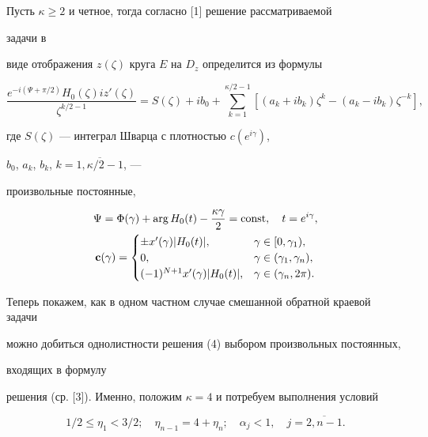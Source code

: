 Пусть $\kappa\ge 2$ и четное, тогда согласно [1] решение рассматриваемой 


задачи в


виде отображения $z(\zeta)$ круга $E$ на $D_z$ определится из формулы


\begin{equation}


\frac{e^{-i(\Psi+\pi/2)}H_0(\zeta)iz'(\zeta)}{\zeta^{k/2-1}}=S(\zeta)+


ib_{0} + \sum_{k=1}^{\kappa/2-1}[(a_k+ib_k)\zeta^k-(a_k-ib_k)\zeta^{-k}],


\end{equation}


где $S(\zeta)$ --- интеграл Шварца с плотностью $c(e^{i\gamma})$,


$b_0$, $a_k$, $b_k$, $k=\overline{1,\kappa/2 -1}$, ---


произвольные постоянные,


\begin{gather*}


\Psi=\Phi(\gamma)+\arg H_0(t)-\frac{\kappa\gamma}{2} = \const,


\quad t=e^{i\gamma},\\


{\bold c}(\gamma)=


\begin{cases}


\pm x'(\gamma)|H_0(t)|, & \gamma\in[0,\gamma_1),\\


0, & \gamma\in(\gamma_1,\gamma_n),\\


(-1)^{N+1}x'(\gamma)|H_0(t)|,& \gamma\in(\gamma_n,2\pi).


\end{cases}


\end{gather*}





Теперь покажем, как в одном частном случае смешанной обратной краевой задачи


можно добиться однолистности решения (4) выбором произвольных постоянных, 


входящих в формулу


решения (ср. [3]). Именно, положим $\kappa=4$ и потребуем выполнения условий


\begin{equation}


1/2\le\eta_1<3/2;\quad \eta_{n-1} = 4+\eta_n;\quad


\alpha_j<1, \quad j=\overline{2,n-1}.


\end{equation}


